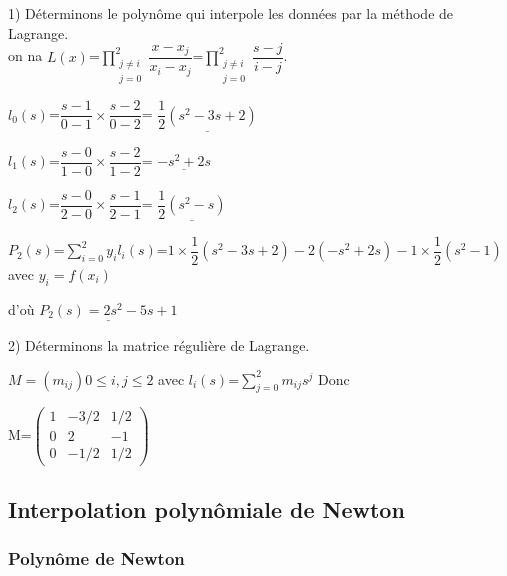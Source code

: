  \begin{flushleft}
 	1) Déterminons le polynôme qui interpole les données par la méthode de Lagrange.\\
 	on na $L(x)$=$\displaystyle\prod_{\substack{j \neq i\\ j=0}}^{2}$$\dfrac{x-x_{j}}{x_{i}-x_{j}}$=$\displaystyle\prod_{\substack{j \neq i\\ j=0}}^{2}$$\dfrac{s-j}{i-j}$.
 	
 	
 	$ l_{0}(s) $=$\dfrac{s-1}{0-1}\times\dfrac{s-2}{0-2}$= $\underline{\dfrac{1}{2}(s^{2}-3s+2)}$
 	
 	$ l_{1}(s) $=$\dfrac{s-0}{1-0}\times\dfrac{s-2}{1-2}$= $\underline{-s^{2}+2s}$
 	
 	$ l_{2}(s) $=$\dfrac{s-0}{2-0}\times\dfrac{s-1}{2-1}$= $\underline{\dfrac{1}{2}(s^{2}-s)}$
 	
 	$ P_{2}(s) $=$ \displaystyle\sum_{i=0}^{2}y_{i}l_{i}(s)$=$ 1\times\dfrac{1}{2}(s^{2}-3s+2)-2(-s^{2}+2s)-1\times\dfrac{1}{2}(s^{2}-1)$ avec $ y_{i}=f(x_{i})$\\
 	
 	
 	\begin{center}
 		d'où $\underline{ P_{2}(s)=2s^{2}-5s+1}$
 	\end{center}
 	
 	2) Déterminons la matrice régulière de Lagrange.
 	
 	\begin{center}
 		$M=(m_{ij}) 0\leq i,j\leq 2$ avec $l_{i}(s)$=$\displaystyle\sum_{j=0}^{2}$$m_{ij}s^{j}$  Donc\\
 		\vspace{0.5cm}
 		
 		M=$\begin{pmatrix}
 		1&-3/2&1/2\\
 		0&2&-1\\
 		0&-1/2&1/2
 		\end{pmatrix}$ 
 	\end{center}
\end{flushleft}
\subsection{Interpolation polynômiale de Newton}

\subsubsection{Polynôme de Newton}

